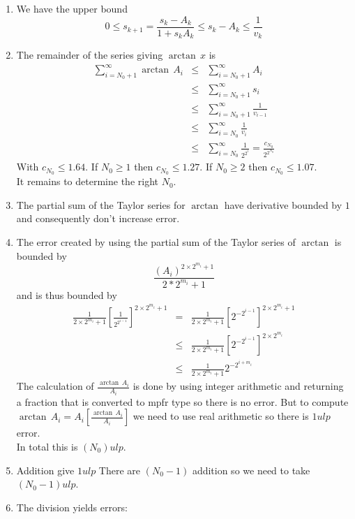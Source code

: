 \documentclass[12pt]{amsart}
\begin{document}
\begin{enumerate}
\item We have the upper bound
\begin{equation*}
0\leq s_{k+1}=\frac{s_k-A_k}{1+s_kA_k}\leq s_k-A_k\leq \frac{1}{v_k}
\end{equation*}
\item The remainder of the series giving $\arctan\,x$ is
\begin{eqnarray*}
\sum_{i=N_0+1}^{\infty}\arctan\,A_i
&\leq &\sum_{i=N_0+1}^{\infty}A_i\\
&\leq &\sum_{i=N_0+1}^{\infty}s_i\\
&\leq &\sum_{i=N_0+1}^{\infty}\frac{1}{v_{i-1}}\\
&\leq &\sum_{i=N_0}^{\infty}\frac{1}{v_{i}}\\
&\leq &\sum_{i=N_0}^{\infty}\frac{1}{2^{2^i}}=\frac{c_{N_0}}{2^{2^{N_0}}}
\end{eqnarray*}
With $c_{N_0}\leq 1.64$. If $N_0\geq 1$ then $c_{N_0}\leq 1.27$. If $N_0\geq 2$ then $c_{N_0}\leq 1.07$.\\
It remains to determine the right $N_0$.
\item The partial sum of the Taylor series for $\arctan$ have derivative bounded by $1$ and consequently don't increase error.
\item The error created by using the partial sum of the Taylor series of $\arctan$ is bounded by
\begin{equation*}
\frac{(A_i)^{2\times 2^{m_i}+1}}{2*2^{m_i}+1}
\end{equation*}
and is thus bounded by
\begin{eqnarray*}
\frac{1}{2 \times 2^{m_i}+1} [\frac{1}{2^{2^{i-1}}}]^{2\times 2^{m_i}+1}
&=&\frac{1}{2 \times 2^{m_i}+1} [2^{-2^{i-1}}]^{2\times 2^{m_i}+1}\\
&\leq &\frac{1}{2 \times 2^{m_i}+1} [2^{-2^{i-1}}]^{2\times 2^{m_i}}\\
&\leq &\frac{1}{2 \times 2^{m_i}+1} 2^{-2^{i+m_i}}
\end{eqnarray*}
The calculation of $\frac{\arctan\,A_i}{A_i}$ is done by using integer arithmetic and returning a fraction that is converted to mpfr type so there is no error. But to compute $\arctan\,A_i=A_i[\frac{\arctan\,A_i}{A_i}]$ we need to use real arithmetic so there is $1 ulp$ error.\\
In total this is $(N_0) ulp$.
\item Addition give $1 ulp$ There are $(N_0-1)$ addition so we need to take $(N_0 -1) ulp$.
\item The division yields errors:

\end{enumerate}
\end{document}
